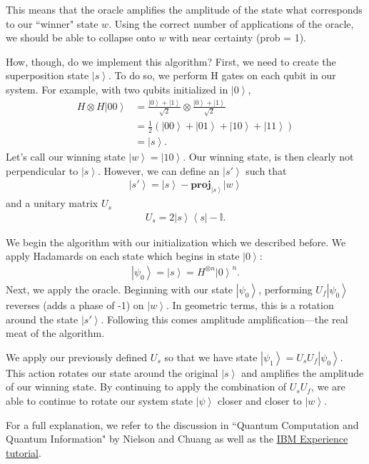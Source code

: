 \documentclass[11pt]{article} %
\newcommand{\bra}[1]{\left\langle #1 \right|}
\newcommand{\ket}[1]{\left|#1\right\rangle}
\begin{document}
This means that the oracle amplifies the amplitude of the state what corresponds to our ``winner" state $w$. Using the correct number of applications of the oracle, we should be able to collapse onto $w$ with near certainty (prob = 1).


How, though, do we implement this algorithm? First, we need to create the superposition state $\ket{s}$. To do so, we perform H gates on each qubit in our system. For example, with two qubits initialized in $\ket{0}$,
\begin{align}
    H\otimes H\ket{00} &= \frac{\ket{0}+\ket{1}}{\sqrt{2}}\otimes\frac{\ket{0}+\ket{1}}{\sqrt{2}}\nonumber\\
    &= \frac{1}{2}(\ket{00}+\ket{01}+\ket{10}+\ket{11})\\
    &= \ket{s}.\nonumber
\end{align}
Let's call our winning state $\ket{w}= \ket{10}$. Our winning state, is then clearly not perpendicular to $\ket{s}$. However, we can define an $\ket{s'}$ such that
\begin{align}
    \ket{s'}=\ket{s}-\textbf{proj}_{\ket{s}}\ket{w}
\end{align}
and a unitary matrix $U_s$
\begin{align}
    U_s=2\ket{s}\bra{s}-\mathbb{I}.
\end{align}

We begin the algorithm with our initialization which we described before. We apply Hadamards on each state which begins in state $\ket{0}$:
\begin{align}
    \ket{\psi_0}=\ket{s}=H^{\otimes n}\ket{0}^n.
\end{align}
Next, we apply the oracle. Beginning with our state $\ket{\psi_0}$, performing $U_f\ket{\psi_0}$ reverses (adds a phase of -1) on $\ket{w}$. In geometric terms, this is a rotation around the state $\ket{s'}$. Following this comes amplitude amplification---the real meat of the algorithm.

We apply our previously defined $U_s$ so that we have state $\ket{\psi_1} = U_sU_f\ket{\psi_0}$. This action rotates our state around the original $\ket{s}$ and amplifies the amplitude of our winning state. By continuing to apply the combination of $U_sU_f$, we are able to continue to rotate our system state $\ket{\psi}$ closer and closer to $\ket{w}$.

For a full explanation, we refer to the discussion in ``Quantum Computation and Quantum Information" by Nielson and Chuang as well as the \href{https://quantumexperience.ng.bluemix.net/proxy/tutorial/full-user-guide/004-Quantum_Algorithms/070-Grover's_Algorithm.html}{IBM Experience tutorial}.
\end{document}
